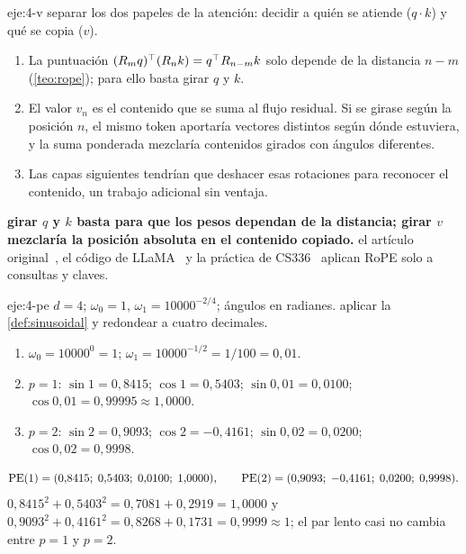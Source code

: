 \begin{solucion}{eje:4-v}
\planteamiento separar los dos papeles de la atención: decidir a quién se atiende ($q\cdot k$) y qué se copia ($v$).
\pasos
\begin{enumerate}[label=\arabic*.]
  \item La puntuación $(R_mq)^{\top}(R_nk)=q^{\top} R_{n-m}k$ solo depende de la distancia $n-m$ (\cref{teo:rope}); para ello basta girar $q$ y $k$.
  \item El valor $v_n$ es el contenido que se suma al flujo residual. Si se girase según la posición $n$, el mismo token aportaría vectores distintos según dónde estuviera, y la suma ponderada mezclaría contenidos girados con ángulos diferentes.
  \item Las capas siguientes tendrían que deshacer esas rotaciones para reconocer el contenido, un trabajo adicional sin ventaja.
\end{enumerate}
\resultado \textbf{girar $q$ y $k$ basta para que los pesos dependan de la distancia; girar $v$ mezclaría la posición absoluta en el contenido copiado.}
\comprobacion el artículo original~\cite{roformer}, el código de LLaMA~\cite{llamacode} y la práctica de CS336~\cite[§3.4.3]{cs336} aplican RoPE solo a consultas y claves.
\end{solucion}

\begin{solucion}{eje:4-pe}
\datos $d=4$; $\omega_0=1$, $\omega_1=10000^{-2/4}$; ángulos en radianes.
\planteamiento aplicar la \cref{def:sinusoidal} y redondear a cuatro decimales.
\pasos
\begin{enumerate}[label=\arabic*.]
  \item $\omega_0=10000^{0}=1$; $\omega_1=10000^{-1/2}=1/100=0{,}01$.
  \item $p=1$: $\sin 1=0{,}8415$; $\cos 1=0{,}5403$; $\sin 0{,}01=0{,}0100$; $\cos 0{,}01=0{,}99995\approx 1{,}0000$.
  \item $p=2$: $\sin 2=0{,}9093$; $\cos 2=-0{,}4161$; $\sin 0{,}02=0{,}0200$; $\cos 0{,}02=0{,}9998$.
\end{enumerate}
\resultado
\[
\operatorname{PE}(1)=(0{,}8415;\;0{,}5403;\;0{,}0100;\;1{,}0000),\qquad \operatorname{PE}(2)=(0{,}9093;\;-0{,}4161;\;0{,}0200;\;0{,}9998).
\]
\comprobacion $0{,}8415^{2}+0{,}5403^{2}=0{,}7081+0{,}2919=1{,}0000$ y $0{,}9093^{2}+0{,}4161^{2}=0{,}8268+0{,}1731=0{,}9999\approx 1$; el par lento casi no cambia entre $p=1$ y $p=2$.
\end{solucion}

